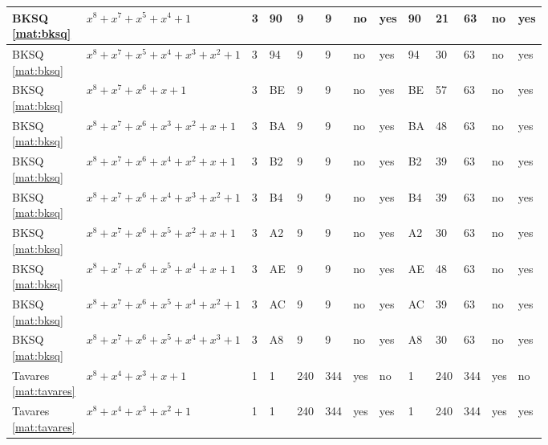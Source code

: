 \begin{tiny}
\begin{longtable}{|l|l|l|l|l|l|l|l|l|l|l|l|l|}
\shortstack{BKSQ \\ \eqref{mat:bksq}} & $x^8 + x^7 + x^5 + x^4 + 1$ & 3 & 90 & 9 & 9 & no & yes & 90 & 21 & 63 & no & yes \\ \hline
\shortstack{BKSQ \\ \eqref{mat:bksq}} & $x^8 + x^7 + x^5 + x^4 + x^3 + x^2 + 1$ & 3 & 94 & 9 & 9 & no & yes & 94 & 30 & 63 & no & yes \\ \hline
\shortstack{BKSQ \\ \eqref{mat:bksq}} & $x^8 + x^7 + x^6 + x + 1$ & 3 & BE & 9 & 9 & no & yes & BE & 57 & 63 & no & yes \\ \hline
\shortstack{BKSQ \\ \eqref{mat:bksq}} & $x^8 + x^7 + x^6 + x^3 + x^2 + x + 1$ & 3 & BA & 9 & 9 & no & yes & BA & 48 & 63 & no & yes \\ \hline
\shortstack{BKSQ \\ \eqref{mat:bksq}} & $x^8 + x^7 + x^6 + x^4 + x^2 + x + 1$ & 3 & B2 & 9 & 9 & no & yes & B2 & 39 & 63 & no & yes \\ \hline
\shortstack{BKSQ \\ \eqref{mat:bksq}} & $x^8 + x^7 + x^6 + x^4 + x^3 + x^2 + 1$ & 3 & B4 & 9 & 9 & no & yes & B4 & 39 & 63 & no & yes \\ \hline
\shortstack{BKSQ \\ \eqref{mat:bksq}} & $x^8 + x^7 + x^6 + x^5 + x^2 + x + 1$ & 3 & A2 & 9 & 9 & no & yes & A2 & 30 & 63 & no & yes \\ \hline
\shortstack{BKSQ \\ \eqref{mat:bksq}} & $x^8 + x^7 + x^6 + x^5 + x^4 + x + 1$ & 3 & AE & 9 & 9 & no & yes & AE & 48 & 63 & no & yes \\ \hline
\shortstack{BKSQ \\ \eqref{mat:bksq}} & $x^8 + x^7 + x^6 + x^5 + x^4 + x^2 + 1$ & 3 & AC & 9 & 9 & no & yes & AC & 39 & 63 & no & yes \\ \hline
\shortstack{BKSQ \\ \eqref{mat:bksq}} & $x^8 + x^7 + x^6 + x^5 + x^4 + x^3 + 1$ & 3 & A8 & 9 & 9 & no & yes & A8 & 30 & 63 & no & yes \\ \hline
\shortstack{Tavares \\ \eqref{mat:tavares}} & $x^8 + x^4 + x^3 + x + 1$ & 1 & 1 & 240 & 344 & yes & no & 1 & 240 & 344 & yes & no \\ \hline
\shortstack{Tavares \\ \eqref{mat:tavares}} & $x^8 + x^4 + x^3 + x^2 + 1$ & 1 & 1 & 240 & 344 & yes & yes & 1 & 240 & 344 & yes & yes \\ \hline

\end{longtable}
\end{tiny}
